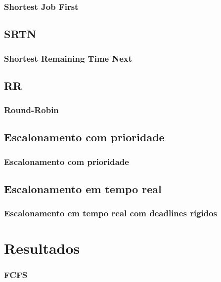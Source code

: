 \documentclass{beamer}
\begin{document}
\begin{frame}
\frametitle{Shortest Job First}

\justifying
\end{frame}

\subsection{SRTN}
\begin{frame}
\frametitle{Shortest Remaining Time Next}

\justifying
\end{frame}

\subsection{RR} 

\begin{frame}
\frametitle{Round-Robin}

\justifying

\end{frame}

\subsection{Escalonamento com prioridade} 

\begin{frame}
\frametitle{Escalonamento com prioridade}

\justifying
\end{frame}

\subsection{Escalonamento em tempo real}
\begin{frame}
\frametitle{Escalonamento em tempo real com deadlines rígidos}


\justifying
\end{frame}
\section{Resultados} 

\begin{frame}
\frametitle{FCFS} 
\justifying
\end{frame}
\end{document}
